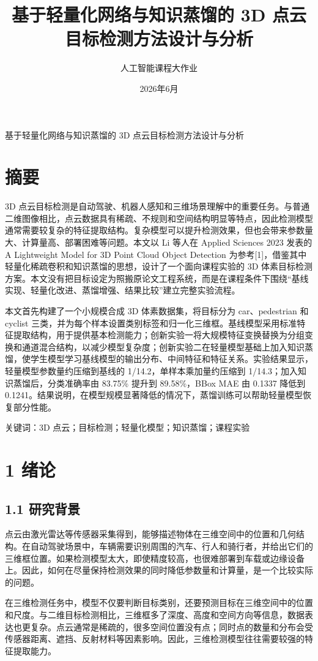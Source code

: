 \documentclass[UTF8]{ctexart}
\title{基于轻量化网络与知识蒸馏的 3D 点云目标检测方法设计与分析}
\author{人工智能课程大作业}
\date{2026年6月}
\begin{document}
\begin{center}\LARGE 基于轻量化网络与知识蒸馏的 3D 点云目标检测方法设计与分析\end{center}

\section{摘要}

3D 点云目标检测是自动驾驶、机器人感知和三维场景理解中的重要任务。与普通二维图像相比，点云数据具有稀疏、不规则和空间结构明显等特点，因此检测模型通常需要较复杂的特征提取结构。复杂模型可以提升检测效果，但也会带来参数量大、计算量高、部署困难等问题。本文以 Li 等人在 Applied Sciences 2023 发表的 A Lightweight Model for 3D Point Cloud Object Detection 为参考[1]，借鉴其中轻量化稀疏卷积和知识蒸馏的思想，设计了一个面向课程实验的 3D 体素目标检测方案。本文没有把目标设定为照搬原论文工程系统，而是在课程条件下围绕“基线实现、轻量化改进、蒸馏增强、结果比较”建立完整实验流程。


本文首先构建了一个小规模合成 3D 体素数据集，将目标分为 car、pedestrian 和 cyclist 三类，并为每个样本设置类别标签和归一化三维框。基线模型采用标准特征提取结构，用于提供基本检测能力；创新实验一将大规模特征变换替换为分组变换和通道混合结构，以减少模型复杂度；创新实验二在轻量模型基础上加入知识蒸馏，使学生模型学习基线模型的输出分布、中间特征和特征关系。实验结果显示，轻量模型参数量约压缩到基线的 1/14.2，单样本乘加量约压缩到 1/14.3；加入知识蒸馏后，分类准确率由 83.75\% 提升到 89.58\%，BBox MAE 由 0.1337 降低到 0.1241。结果说明，在模型规模显著降低的情况下，蒸馏训练可以帮助轻量模型恢复部分性能。


关键词：3D 点云；目标检测；轻量化模型；知识蒸馏；课程实验


\section{1 绪论}

\subsection{1.1 研究背景}

点云由激光雷达等传感器采集得到，能够描述物体在三维空间中的位置和几何结构。在自动驾驶场景中，车辆需要识别周围的汽车、行人和骑行者，并给出它们的三维框位置。如果检测模型太大，即使精度较高，也很难部署到车载或边缘设备上。因此，如何在尽量保持检测效果的同时降低参数量和计算量，是一个比较实际的问题。


在三维检测任务中，模型不仅要判断目标类别，还要预测目标在三维空间中的位置和尺度。与二维目标检测相比，三维框多了深度、高度和空间方向等信息，数据表达也更复杂。点云通常是稀疏的，很多空间位置没有点；同时点的数量和分布会受传感器距离、遮挡、反射材料等因素影响。因此，三维检测模型往往需要较强的特征提取能力。
\end{document}
